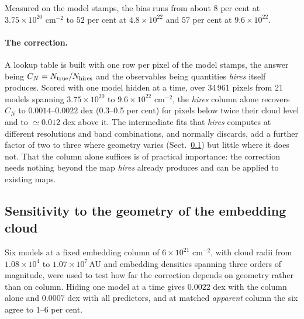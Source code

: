 \documentclass[11pt,a4paper]{article}
\begin{document}
Measured on the model stamps, the bias runs from about $8$ per cent at
$3.75\times10^{20}$ cm$^{-2}$ to $52$ per cent at $4.8\times10^{22}$ and $57$
per cent at $9.6\times10^{22}$.

\paragraph{The correction.} A lookup table is built with one row per pixel of
the model stamps, the answer being $C_N = N_{\rm true}/N_{\rm hires}$ and the
observables being quantities \emph{hires} itself produces. Scored with one model
hidden at a time, over 34\,961 pixels from 21 models spanning
$3.75\times10^{20}$ to $9.6\times10^{22}$ cm$^{-2}$, the \emph{hires} column
alone recovers $C_N$ to $0.0014$--$0.0022$ dex (0.3--0.5 per cent) for pixels
below twice their cloud level and to $\simeq0.012$ dex above it. The
intermediate fits that \emph{hires} computes at different resolutions and band
combinations, and normally discards, add a further factor of two to three where
geometry varies (Sect.~\ref{sec:practice-hires-geom}) but little where it does
not. That the column alone suffices is of practical importance: the correction
needs nothing beyond the map \emph{hires} already produces and can be applied to
existing maps.


\subsection{Sensitivity to the geometry of the embedding cloud}
\label{sec:practice-hires-geom}

Six models at a fixed embedding column of $6\times10^{21}$ cm$^{-2}$, with cloud
radii from $1.08\times10^{4}$ to $1.07\times10^{7}\,$AU and embedding densities
spanning three orders of magnitude, were used to test how far the correction
depends on geometry rather than on column. Hiding one model at a time gives
$0.0022$ dex with the column alone and $0.0007$ dex with all predictors, and at
matched \emph{apparent} column the six agree to $1$--$6$ per cent.
\end{document}
